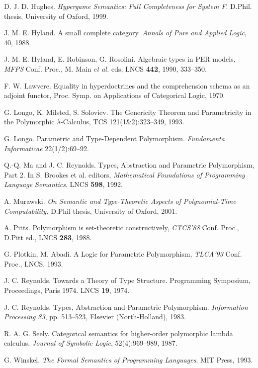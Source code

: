 \documentclass[a4paper,11pt]{article}
\begin{document}
\begin{thebibliography}{DDDD88}
 D. J. D. Hughes.  {\em Hypergame Semantics:
    Full Completeness for System F}. D.Phil. thesis, University of
  Oxford, 1999.

 J. M. E. Hyland. A small complete
  category. {\em Annals of Pure and Applied Logic}, 40, 1988.

 J. M. E. Hyland, E. Robinson,
  G. Rosolini. Algebraic types in PER models, {\em MFPS} Conf. Proc.,
  M. Main {\em et al.} eds, LNCS {\bf 442},
1990, 333--350.

 F. W. Lawvere. Equality in hyperdoctrines and the comprehension schema as an adjoint functor,  Proc.  Symp. on Applications of Categorical Logic, 1970.

 G. Longo, K. Milsted, S. Soloviev.
The Genericity Theorem and Parametricity
in the Polymorphic $\lambda$-Calculus, TCS 121(1\&2):323--349,  1993.

G. Longo. Parametric and Type-Dependent Polymorphism.
{\em Fundamenta Informaticae} 22(1/2):69--92.

Q.-Q. Ma and J. C. Reynolds.
Types, Abstraction and Parametric Polymorphism, Part 2.
In S. Brookes et al. editors, {\em Mathematical Foundations of
Programming Language Semantics}. LNCS {\bf 598}, 1992.

A. Murawski.
{\em On Semantic and Type-Theoretic Aspects of Polynomial-Time Computability.}
D.Phil thesis, University of Oxford, 2001.

 A. Pitts. Polymorphism is set-theoretic constructively,
 {\em CTCS'88} Conf. Proc., D.Pitt ed., LNCS {\bf 283}, 1988.

 G. Plotkin, M. Abadi. A Logic for Parametric
Polymorphism, {\em TLCA'93} Conf. Proc., LNCS, 1993.

 J. C. Reynolds.
Towards a Theory of Type Structure.
Programming Symposium, Proceedings, Paris 1974. LNCS {\bf 19}, 1974.

J. C. Reynolds.
Types, Abstraction and Parametric Polymorphism.
{\em Information Processing 83}, pp. 513--523, Elsevier
(North-Holland), 1983.

R. A. G. Seely.
Categorical semantics for higher-order polymorphic lambda calculus.
{\em Journal of Symbolic Logic}, 52(4):969--989, 1987.

G. Winskel.
{\em The Formal Semantics of Programming Languages}.
MIT Press, 1993.

\end{thebibliography}
\end{document}
